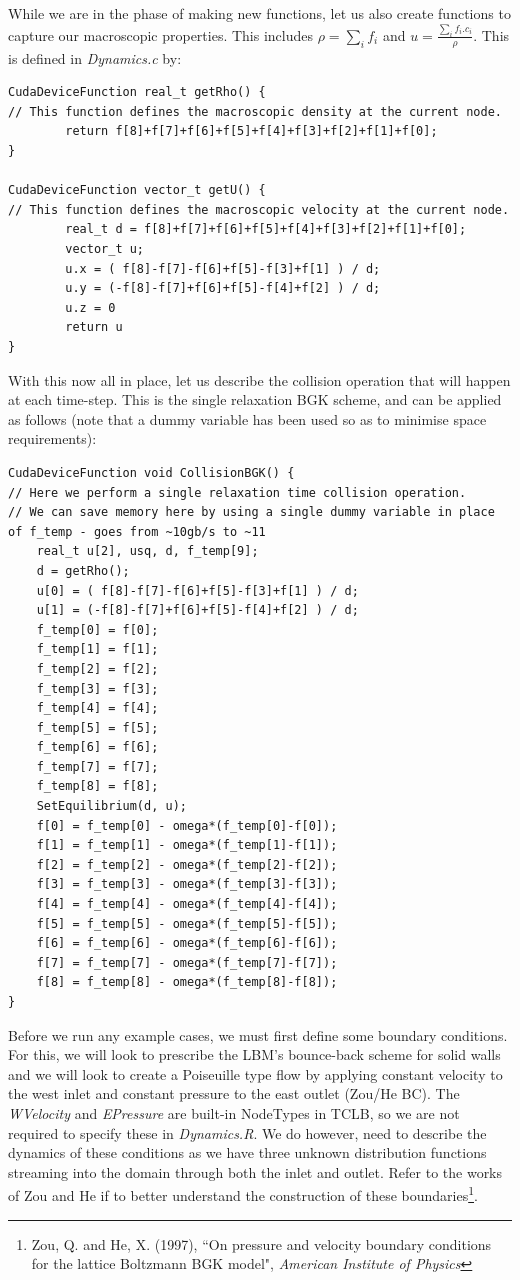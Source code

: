 \documentclass[12pt,a4paper]{report}
\begin{document}
While we are in the phase of making new functions, let us also create functions to capture our macroscopic properties. This includes $\rho = \sum_i f_i$ and $u = \frac{\sum_i f_i.c_i}{\rho}$. This is defined in \textit{Dynamics.c} by:
\begin{lstlisting}
CudaDeviceFunction real_t getRho() {
// This function defines the macroscopic density at the current node.
        return f[8]+f[7]+f[6]+f[5]+f[4]+f[3]+f[2]+f[1]+f[0];
}

CudaDeviceFunction vector_t getU() {
// This function defines the macroscopic velocity at the current node.
        real_t d = f[8]+f[7]+f[6]+f[5]+f[4]+f[3]+f[2]+f[1]+f[0];
        vector_t u;
        u.x = ( f[8]-f[7]-f[6]+f[5]-f[3]+f[1] ) / d;
        u.y = (-f[8]-f[7]+f[6]+f[5]-f[4]+f[2] ) / d;
        u.z = 0
        return u
}
\end{lstlisting} 

With this now all in place, let us describe the collision operation that will happen at each time-step. This is the single relaxation BGK scheme, and can be applied as follows (note that a dummy variable has been used so as to minimise space requirements):
\begin{lstlisting}
CudaDeviceFunction void CollisionBGK() {
// Here we perform a single relaxation time collision operation.
// We can save memory here by using a single dummy variable in place of f_temp - goes from ~10gb/s to ~11
	real_t u[2], usq, d, f_temp[9];
	d = getRho();
	u[0] = ( f[8]-f[7]-f[6]+f[5]-f[3]+f[1] ) / d;
	u[1] = (-f[8]-f[7]+f[6]+f[5]-f[4]+f[2] ) / d;
	f_temp[0] = f[0];
	f_temp[1] = f[1];
	f_temp[2] = f[2];
	f_temp[3] = f[3];
	f_temp[4] = f[4];
	f_temp[5] = f[5];
	f_temp[6] = f[6];
	f_temp[7] = f[7];
	f_temp[8] = f[8];
	SetEquilibrium(d, u);
	f[0] = f_temp[0] - omega*(f_temp[0]-f[0]);	
	f[1] = f_temp[1] - omega*(f_temp[1]-f[1]);
	f[2] = f_temp[2] - omega*(f_temp[2]-f[2]);
	f[3] = f_temp[3] - omega*(f_temp[3]-f[3]);	
	f[4] = f_temp[4] - omega*(f_temp[4]-f[4]);
	f[5] = f_temp[5] - omega*(f_temp[5]-f[5]);
	f[6] = f_temp[6] - omega*(f_temp[6]-f[6]);	
	f[7] = f_temp[7] - omega*(f_temp[7]-f[7]);
	f[8] = f_temp[8] - omega*(f_temp[8]-f[8]);
}
\end{lstlisting}

Before we run any example cases, we must first define some boundary conditions. For this, we will look to prescribe the LBM's bounce-back scheme for solid walls and we will look to create a Poiseuille type flow by applying constant velocity to the west inlet and constant pressure to the east outlet (Zou/He BC). The \textit{WVelocity} and \textit{EPressure} are built-in NodeTypes in TCLB, so we are not required to specify these in \textit{Dynamics.R}. We do however, need to describe the dynamics of these conditions as we have three unknown distribution functions streaming into the domain through both the inlet and outlet. Refer to the works of Zou and He if to better understand the construction of these boundaries\footnote{Zou, Q. and He, X. (1997), ``On pressure and velocity boundary conditions for the lattice Boltzmann BGK model", \textit{American Institute of Physics}}.\\
\end{document}
